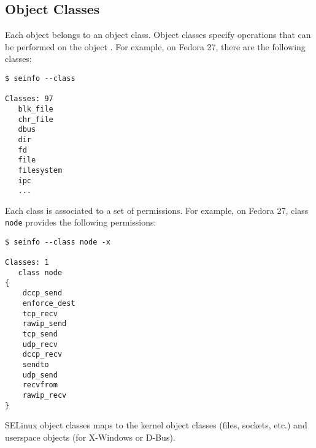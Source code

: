 \subsection{Object Classes}
Each object belongs to an object class. Object classes specify operations that
can be performed on the object \cite[pp.~29--30]{tsn}. For example, on Fedora
27, there are the following classes:
\begin{lstlisting}
$ seinfo --class

Classes: 97
   blk_file
   chr_file
   dbus
   dir
   fd
   file
   filesystem
   ipc
   ...
\end{lstlisting}

Each class is associated to a set of permissions. For example, on Fedora 27,
class \texttt{node} provides the following permissions:
\begin{lstlisting}
$ seinfo --class node -x

Classes: 1
   class node
{
	dccp_send
	enforce_dest
	tcp_recv
	rawip_send
	tcp_send
	udp_recv
	dccp_recv
	sendto
	udp_send
	recvfrom
	rawip_recv
}
\end{lstlisting}
SELinux object classes maps to the kernel object classes (files, sockets, etc.)
and userspace objects (for X-Windows or D-Bus).

